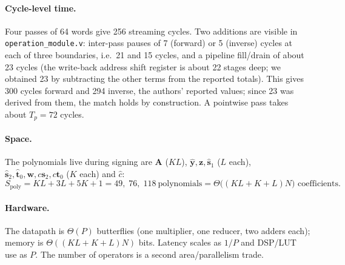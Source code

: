\documentclass[12pt,a4paper]{report}
\newcommand{\code}[1]{\texttt{#1}}
\begin{document}
\paragraph{Cycle-level time.}
Four passes of 64 words give 256 streaming cycles. Two additions are visible in \code{operation\_module.v}: inter-pass pauses of 7 (forward) or 5 (inverse) cycles at each of three boundaries, i.e.\ 21 and 15 cycles, and a pipeline fill/drain of about 23 cycles (the write-back address shift register is about 22 stages deep; we obtained 23 by subtracting the other terms from the reported totals). This gives 300 cycles forward and 294 inverse, the authors' reported values; since 23 was derived from them, the match holds by construction. A pointwise pass takes about $T_p=72$ cycles.

\paragraph{Space.}
The polynomials live during signing are $\mathbf{A}$ ($KL$), $\hat{\mathbf{y}},\mathbf{z},\hat{\mathbf{s}}_1$ ($L$ each), $\hat{\mathbf{s}}_2,\hat{\mathbf{t}}_0,\mathbf{w},c\mathbf{s}_2,c\mathbf{t}_0$ ($K$ each) and $\hat c$:
\begin{equation}
  S_{\text{poly}}=KL+3L+5K+1=49,\;76,\;118\ \text{polynomials}=\Theta\big((KL+K+L)N\big)\text{ coefficients.}
  \label{eq:space}
\end{equation}

\paragraph{Hardware.}
The datapath is $\Theta(P)$ butterflies (one multiplier, one reducer, two adders each); memory is $\Theta((KL+K+L)N)$ bits. Latency scales as $1/P$ and DSP/LUT use as $P$. The number of operators is a second area/parallelism trade.
\end{document}

